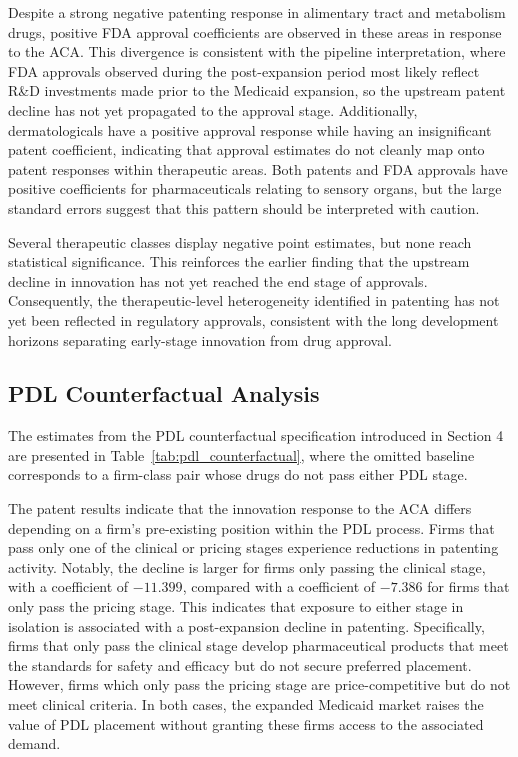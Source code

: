 \documentclass[12pt]{article}
\begin{document}
Despite a strong negative patenting response in alimentary tract and metabolism drugs, positive FDA approval coefficients are observed in these areas in response to the ACA. This divergence is consistent with the pipeline interpretation, where FDA approvals observed during the post-expansion period most likely reflect R\&D investments made prior to the Medicaid expansion, so the upstream patent decline has not yet propagated to the approval stage. Additionally, dermatologicals have a positive approval response while having an insignificant patent coefficient, indicating that approval estimates do not cleanly map onto patent responses within therapeutic areas. Both patents and FDA approvals have positive coefficients for pharmaceuticals relating to sensory organs, but the large standard errors suggest that this pattern should be interpreted with caution.

Several therapeutic classes display negative point estimates, but none reach statistical significance. This reinforces the earlier finding that the upstream decline in innovation has not yet reached the end stage of approvals. Consequently, the therapeutic-level heterogeneity identified in patenting has not yet been reflected in regulatory approvals, consistent with the long development horizons separating early-stage innovation from drug approval.

\subsection{PDL Counterfactual Analysis}

The estimates from the PDL counterfactual specification introduced in Section 4 are presented in Table~\ref{tab:pdl_counterfactual}, where the omitted baseline corresponds to a firm-class pair whose drugs do not pass either PDL stage.

\begingroup\footnotesize

\label{tab:pdl_counterfactual}
\endgroup

The patent results indicate that the innovation response to the ACA differs depending on a firm's pre-existing position within the PDL process. Firms that pass only one of the clinical or pricing stages experience reductions in patenting activity. Notably, the decline is larger for firms only passing the clinical stage, with a coefficient of $-11.399$, compared with a coefficient of $-7.386$ for firms that only pass the pricing stage. This indicates that exposure to either stage in isolation is associated with a post-expansion decline in patenting. Specifically, firms that only pass the clinical stage develop pharmaceutical products that meet the standards for safety and efficacy but do not secure preferred placement. However, firms which only pass the pricing stage are price-competitive but do not meet clinical criteria. In both cases, the expanded Medicaid market raises the value of PDL placement without granting these firms access to the associated demand.
\end{document}
